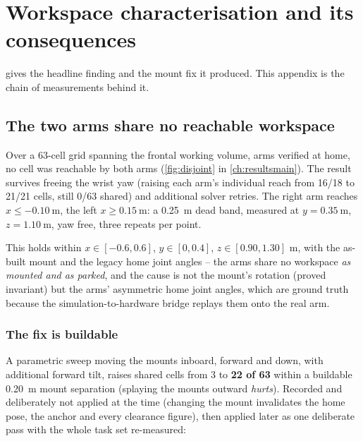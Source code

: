 \chapter{Workspace characterisation and its consequences}
\label{ch:workspace}

 gives the headline finding and the mount fix it
produced. This appendix is the chain of measurements behind it.

\section{The two arms share no reachable workspace}

Over a 63-cell grid spanning the frontal working volume, arms verified at
home, no cell was reachable by both arms (\cref{fig:disjoint} in
\cref{ch:resultsmain}). The result survives freeing the wrist yaw (raising
each arm's individual reach from 16/18 to 21/21 cells, still 0/63 shared)
and additional solver retries. The right arm reaches
$x\le\SI{-0.10}{\metre}$, the left $x\ge\SI{0.15}{\metre}$: a
\SI{0.25}{\metre} dead band, measured at $y=\SI{0.35}{\metre}$,
$z=\SI{1.10}{\metre}$, yaw free, three repeats per point.

This holds within $x\in[-0.6,0.6]$, $y\in[0,0.4]$, $z\in[0.90,1.30]$
\si{\metre}, with the as-built mount and the legacy home joint angles -- the
arms share no workspace \emph{as mounted and as parked}, and the cause is
not the mount's rotation (proved invariant) but the arms' asymmetric home
joint angles, which are ground truth because the simulation-to-hardware
bridge replays them onto the real arm.

\subsection{The fix is buildable}

A parametric sweep moving the mounts inboard, forward and down, with
additional forward tilt, raises shared cells from 3 to \textbf{22 of 63}
within a buildable \SI{0.20}{\metre} mount separation (splaying the mounts
outward \emph{hurts}). Recorded and deliberately not applied at the time
(changing the mount invalidates the home pose, the anchor and every
clearance figure), then applied later as one deliberate pass with the whole
task set re-measured:

